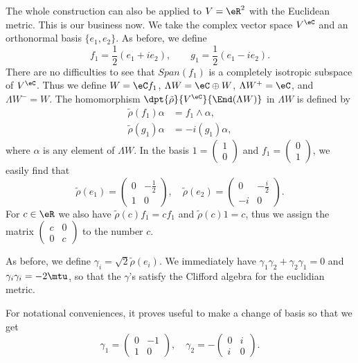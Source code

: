The whole construction can also be applied to $V=\eR^2$ with the Euclidean metric. This is our business now. We take the complex vector space $V^{\eC}$ and an orthonormal basis $\{e_1,e_2\}$. As before, we define
\[
	f_1=\frac{1}{2}(e_1+ie_2),\qquad g_1=\frac{1}{2}(e_1-ie_2).
\]
There are no difficulties to see that $Span(f_1)$ is a completely isotropic subspace of $V^{\eC}$. Thus we define $W=\eC f_1$, $\Lambda W =\eC\oplus W$, $\Lambda W^+=\eC$, and $\Lambda W^-=W$. The homomorphism $\dpt{\tilde\rho}{V^{\eC}}{\End(\Lambda W )}$ in $\Lambda W $ is defined by
\begin{equation}
	\begin{split}
		\tilde\rho(f_1)\alpha&=f_1\wedge\alpha,\\
		\tilde\rho(g_1)\alpha&=-i(g_1)\alpha,
	\end{split}
\end{equation}
where $\alpha$ is any element of $\Lambda W $. In the basis $1=\begin{pmatrix}
		1 \\
		0
	\end{pmatrix} $ and $f_1=\begin{pmatrix}
		0 \\
		1
	\end{pmatrix} $, we easily find that
\[
	\tilde\rho(e_1)=\begin{pmatrix}
		0 & -\frac{1}{2} \\
		1 & 0
	\end{pmatrix},\quad\tilde\rho(e_2)=\begin{pmatrix}
		0  & -\frac{i}{2} \\
		-i & 0
	\end{pmatrix}.\]
For $c\in\eR$ we	 also have $\tilde\rho(c)f_1=cf_1$ and $\tilde\rho(c)1=c$, thus we assign the matrix $\begin{pmatrix}
		c & 0 \\
		0 & c
	\end{pmatrix}$ to the number $c$.

As before, we define $\gamma_i=\sqrt{2}\tilde\rho(e_i)$. We immediately have $\gamma_1\gamma_2+\gamma_2\gamma_1=0$ and $\gamma_i\gamma_i=-2\mtu$, so that the $\gamma$'s satisfy the Clifford algebra for the euclidian metric.

For notational conveniences, it proves useful to make a change of basis so that we get
\begin{equation}\label{gammaR2}
	\gamma_1=\begin{pmatrix}
		0 & -1 \\
		1 & 0
	\end{pmatrix},\quad\gamma_2=-\begin{pmatrix}
		0 & i \\
		i & 0
	\end{pmatrix}.
\end{equation}

